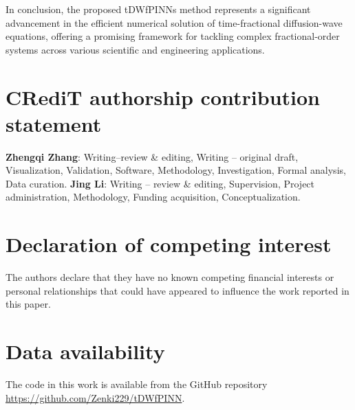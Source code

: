 \documentclass[preprint,3p,times]{elsarticle}
\begin{document}
In conclusion, the proposed tDWfPINNs method represents a significant advancement in the efficient numerical solution of time-fractional diffusion-wave equations, offering a promising framework for tackling complex fractional-order systems across various scientific and engineering applications.

\section*{CRediT authorship contribution statement}
\textbf{Zhengqi Zhang}: Writing–review \& editing, Writing – original draft, Visualization, Validation, Software, Methodology, Investigation, Formal analysis, Data curation. \textbf{Jing Li}: Writing – review \& editing, Supervision, Project administration, Methodology, Funding acquisition, Conceptualization.


\section*{Declaration of competing interest}
  The authors declare that they have no known competing financial interests or personal relationships that could have appeared to influence the work reported in this paper.

\section*{Data availability}
The code in this work is available from the GitHub repository \url{https://github.com/Zenki229/tDWfPINN}.


 



    
\end{document}
